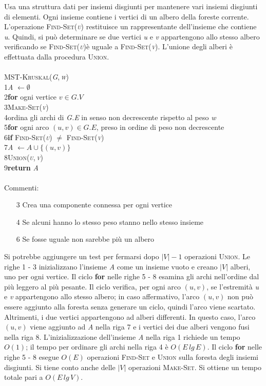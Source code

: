 \documentclass[10pt, a4paper]{report}
\newcommand\firsttab[1][0.5cm]{\hspace*{#1}}
\newcommand\secondtab[1][1cm]{\hspace*{#1}}
\newcommand\thirdtab[1][1.5cm]{\hspace*{#1}}
\begin{document}
Usa una struttura dati per insiemi disgiunti per mantenere vari insiemi disgiunti di elementi. Ogni insieme contiene i vertici di un albero della foreste corrente. L'operazione \textsc{Find-Set(\textit{u})} restituisce un rappresentante dell'insieme che contiene \textit{u}. Quindi, si può determinare se due vertici \textit{u} e \textit{v} appartengono allo stesso albero verificando se \textsc{Find-Set(\textit{u})}è uguale a \textsc{Find-Set(\textit{v})}. L'unione degli alberi è effettuata dalla procedura \textsc{Union}.\\\\
\textsc{MST-Kruskal(\textit{G},\,\textit{w})}\\
1\firsttab\textit{A} $\leftarrow \emptyset$\\
2\firsttab\textbf{for} ogni vertice $v \in G.V$\\
3\secondtab\textsc{Make-Set(\textit{v})}\\
4\firsttab ordina gli archi di \textit{G.E} in senso non decrescente rispetto al peso \textit{w}\\
5\firsttab\textbf{for} ogni arco $(u,v) \in G.E$, preso in ordine di peso non decrescente\\
6\secondtab\textbf{if} \textsc{Find-Set(\textit{u})} $\neq$ \textsc{Find-Set(\textit{v})}\\
7\thirdtab\textit{A} $\leftarrow A \cup \{(u,v)\}$\\
8\thirdtab\textsc{Union(\textit{u},\,\textit{v})}\\
9\firsttab\textbf{return} \textit{A}\\\\
Commenti:
\begin{enumerate}
\item[3]Crea una componente connessa per ogni vertice
\item[4]Se alcuni hanno lo stesso peso stanno nello stesso insieme
\item[6]Se fosse uguale non sarebbe più un albero
\end{enumerate}
Si potrebbe aggiungere un test per fermarsi dopo $|V| - 1$ operazioni \textsc{Union}. Le righe 1 - 3 inizializzano l'insieme \textit{A} come un insieme vuoto e creano $|V|$ alberi, uno per ogni vertice. Il ciclo \textbf{for} nelle righe 5 - 8 esamina gli archi nell'ordine dal più leggero al più pesante. Il ciclo verifica, per ogni arco $(u,v)$, se l'estremità \textit{u} e \textit{v} appartengono allo stesso albero; in caso affermativo, l'arco $(u,v)$ non può essere aggiunto alla foresta senza generare un ciclo, quindi l'arco viene scartato. Altrimenti, i due vertici appartengono ad alberi differenti. In questo caso, l'arco $(u,v)$ viene aggiunto ad \textit{A} nella riga 7 e i vertici dei due alberi vengono fusi nella riga 8. L'inizializzazione dell'insieme \textit{A}  nella riga 1 richiede un tempo $O(1)$; il tempo per ordinare gli archi nella riga 4 è $O(E\,lg\,E)$. Il ciclo \textbf{for} nelle righe 5 - 8 esegue $O(E)$ operazioni \textsc{Find-Set} e \textsc{Union} sulla foresta degli insiemi disgiunti. Si tiene conto anche delle $|V|$ operazioni \textsc{Make-Set}. Si ottiene un tempo totale pari a $O(E\,lg\,V)$.
\end{document}

